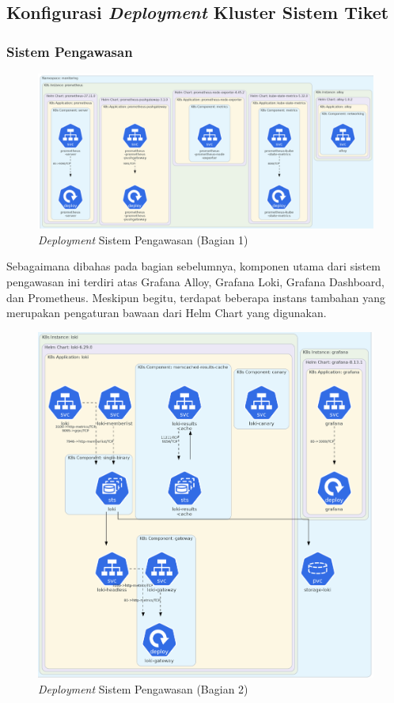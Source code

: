 \subsection{Konfigurasi \textit{Deployment} Kluster Sistem Tiket}

\subsubsection{Sistem Pengawasan}

\begin{figure}[htbp]
    \centering
    \includegraphics[width=1\textwidth]{resources/chapter-4/monitoring-1.png}
    \caption{\textit{Deployment} Sistem Pengawasan (Bagian 1)}
    \label{fig:deployment-monitoring-1}
\end{figure}

Sebagaimana dibahas pada bagian sebelumnya, komponen utama dari sistem pengawasan ini terdiri atas Grafana Alloy, Grafana Loki, Grafana Dashboard, dan Prometheus. Meskipun begitu, terdapat beberapa instans tambahan yang merupakan pengaturan bawaan dari Helm Chart yang digunakan.

\begin{figure}[htbp]
    \centering
    \includegraphics[width=1\textwidth]{resources/chapter-4/monitoring-2.png}
    \caption{\textit{Deployment} Sistem Pengawasan (Bagian 2)}
    \label{fig:deployment-monitoring-2}
\end{figure}

